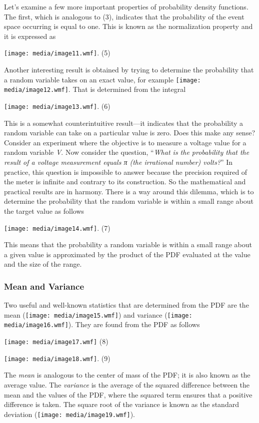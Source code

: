 Let's examine a few more important properties of probability density
functions. The first, which is analogous to (3), indicates that the
probability of the event space occurring is equal to one. This is known
as the normalization property and it is expressed as

\texttt{[image: media/image11.wmf]}. (5)

Another interesting result is obtained by trying to determine the
probability that a random variable takes on an exact value, for example
\texttt{[image: media/image12.wmf]}. That is determined from the
integral

\texttt{[image: media/image13.wmf]}. (6)

This is a somewhat counterintuitive result---it indicates that the
probability a random variable can take on a particular value is zero.
Does this make any sense? Consider an experiment where the objective is
to measure a voltage value for a random variable \emph{V}. Now consider
the question, ``\emph{What is the probability that the result of a
voltage measurement equals π (the irrational number) volts?}'' In
practice, this question is impossible to answer because the precision
required of the meter is infinite and contrary to its construction. So
the mathematical and practical results are in harmony. There is a way
around this dilemma, which is to determine the probability that the
random variable is within a small range about the target value as
follows

\texttt{[image: media/image14.wmf]}. (7)

This means that the probability a random variable is within a small
range about a given value is approximated by the product of the PDF
evaluated at the value and the size of the range.

\subsubsection{Mean and Variance}\label{mean-and-variance}

Two useful and well-known statistics that are determined from the PDF
are the mean (\texttt{[image: media/image15.wmf]}) and variance
(\texttt{[image: media/image16.wmf]}). They are found from the PDF as
follows

\texttt{[image: media/image17.wmf]} (8)

\texttt{[image: media/image18.wmf]}. (9)

The \emph{mean} is analogous to the center of mass of the PDF; it is
also known as the average value. The \emph{variance} is the average of
the squared difference between the mean and the values of the PDF, where
the squared term ensures that a positive difference is taken. The square
root of the variance is known as the standard deviation
(\texttt{[image: media/image19.wmf]}).

